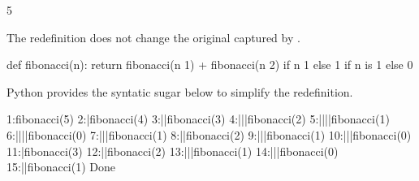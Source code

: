 \documentclass[letterpaper,10pt,english]{sphinxmanual}
\begin{document}
\begin{sphinxVerbatim}[commandchars=\\\{\}]
5
\end{sphinxVerbatim}

The redefinition does not change the original  captured by .

\begin{sphinxVerbatim}[commandchars=\\\{\}]
 
   
     
\end{sphinxVerbatim}

\begin{sphinxVerbatim}[commandchars=\\\{\}]
def fibonacci(n):
    return fibonacci(n \PYGZhy{} 1) + fibonacci(n \PYGZhy{} 2) if n \PYGZgt{} 1 else 1 if n is 1 else 0
\end{sphinxVerbatim}

Python provides the syntatic sugar below to simplify the redefinition.

\begin{sphinxVerbatim}[commandchars=\\\{\}]
 
                       


\end{sphinxVerbatim}

\begin{sphinxVerbatim}[commandchars=\\\{\}]
  1:fibonacci(5)
  2:|fibonacci(4)
  3:||fibonacci(3)
  4:|||fibonacci(2)
  5:||||fibonacci(1)
  6:||||fibonacci(0)
  7:|||fibonacci(1)
  8:||fibonacci(2)
  9:|||fibonacci(1)
 10:|||fibonacci(0)
 11:|fibonacci(3)
 12:||fibonacci(2)
 13:|||fibonacci(1)
 14:|||fibonacci(0)
 15:||fibonacci(1)
Done
\end{sphinxVerbatim}
\end{document}
